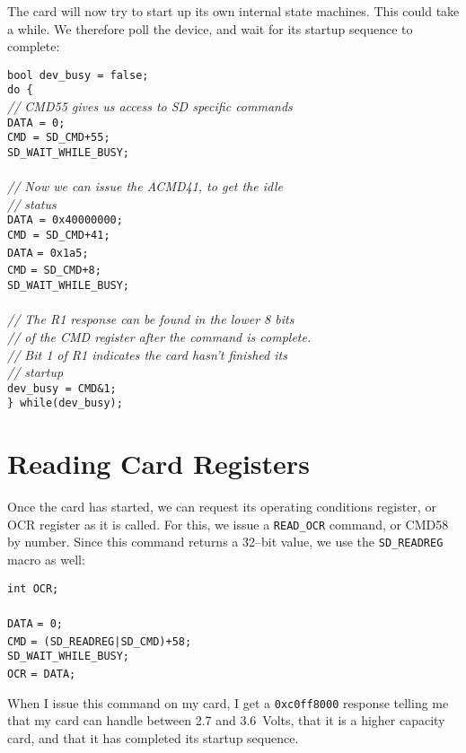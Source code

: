 \documentclass{gqtekspec}
\begin{document}
The card will now try to start up its own internal state machines.  This could
take a while.  We therefore poll the device, and wait for its startup sequence
to complete:
\begin{tabbing}
{\tt bool dev\_busy = false;} \\
{\tt do \{}\=\\
\> {\em // CMD55 gives us access to SD specific commands}\\
\> {\tt DATA = 0;}\\
\> {\tt CMD = SD\_CMD+55;}\\
\> {\tt SD\_WAIT\_WHILE\_BUSY;}\\
\\
\> {\em // Now we can issue the ACMD41, to get the idle}\\
\> {\em // status}\\
\> {\tt DATA = 0x40000000;} \\
\> {\tt CMD = SD\_CMD+41;} \\
\> {\tt DATA} \= {\tt = 0x1a5;} \\
\> {\tt CMD} \> {\tt = SD\_CMD+8;} \\
\> {\tt SD\_WAIT\_WHILE\_BUSY;} \\
\\
\> {\em // The R1 response can be found in the lower 8 bits}\\
\> {\em // of the CMD register after the command is complete.}\\
\> {\em // Bit 1 of R1 indicates the card hasn't finished its}\\
\> {\em // startup}\\
\> {\tt dev\_busy = CMD\&1;}\\
{\tt \} while(dev\_busy);}
\end{tabbing}

\section{Reading Card Registers}

Once the card has started, we can request its operating conditions register,
or OCR register as it is called.  For this, we issue a {\tt READ\_OCR} command,
or CMD58 by number.  Since this command returns a 32--bit value, we use the
{\tt SD\_READREG} macro as well:
\begin{tabbing}
{\tt int OCR;}\\
\\
{\tt DATA} \= {\tt = 0;} \\
{\tt CMD} \> {\tt = (SD\_READREG|SD\_CMD)+58;} \\
{\tt SD\_WAIT\_WHILE\_BUSY;} \\
{\tt OCR} \= {\tt = DATA;}\\
\end{tabbing}
When I issue this command on my card, I get a {\tt 0xc0ff8000} response telling
me that my card can handle between 2.7 and 3.6~Volts, that it is a higher
capacity card, and that it has completed its startup sequence.
\end{document}
